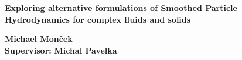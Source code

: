 \documentclass[oneside, a4paper, onecolumn, 11pt]{article}
\begin{document}






\begin{center}
    \vspace*{\fill}
    {\Huge\bfseries Exploring alternative formulations of Smoothed Particle Hydrodynamics for complex fluids and solids}
    \vspace*{\fill}
\end{center}
\begin{center}
    \textbf{Michael Monček}\\
    \textbf{Supervisor:} \textbf{Michal Pavelka}\\
\end{center}

\end{document}
